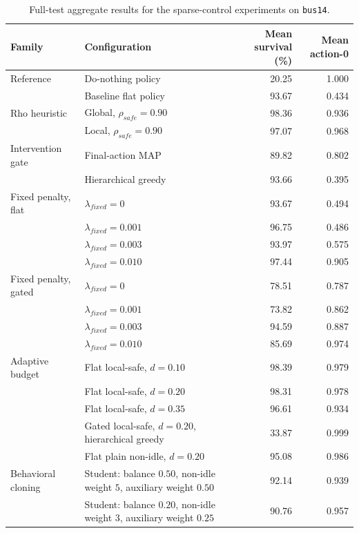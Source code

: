 \begin{table}[H]
  \centering
  \scriptsize
  \caption{Full-test aggregate results for the sparse-control experiments on
  \texttt{bus14}.}
  \label{tab:sparse-control-full-results}
  \setlength{\tabcolsep}{4pt}
  \renewcommand{\arraystretch}{0.94}
  \begin{tabular}{L{0.14\textwidth}L{0.48\textwidth}rr}
    \toprule
    Family & Configuration & Mean survival (\%) & Mean action-0 \\
    \midrule
    Reference
      & Do-nothing policy & 20.25 & 1.000 \\
      & Baseline flat policy & 93.67 & 0.434 \\
    \midrule
    Rho heuristic
      & Global, $\rho_{safe}=0.90$ & 98.36 & 0.936 \\
      & Local, $\rho_{safe}=0.90$ & 97.07 & 0.968 \\
    \midrule
    Intervention gate
      & Final-action MAP & 89.82 & 0.802 \\
      & Hierarchical greedy & 93.66 & 0.395 \\
    \midrule
    Fixed penalty, flat
      & $\lambda_{fixed}=0$ & 93.67 & 0.494 \\
      & $\lambda_{fixed}=0.001$ & 96.75 & 0.486 \\
      & $\lambda_{fixed}=0.003$ & 93.97 & 0.575 \\
      & $\lambda_{fixed}=0.010$ & 97.44 & 0.905 \\
    \midrule
    Fixed penalty, gated
      & $\lambda_{fixed}=0$ & 78.51 & 0.787 \\
      & $\lambda_{fixed}=0.001$ & 73.82 & 0.862 \\
      & $\lambda_{fixed}=0.003$ & 94.59 & 0.887 \\
      & $\lambda_{fixed}=0.010$ & 85.69 & 0.974 \\
    \midrule
    Adaptive budget
      & Flat local-safe, $d=0.10$ & 98.39 & 0.979 \\
      & Flat local-safe, $d=0.20$ & 98.31 & 0.978 \\
      & Flat local-safe, $d=0.35$ & 96.61 & 0.934 \\
      & Gated local-safe, $d=0.20$, hierarchical greedy & 33.87 & 0.999 \\
      & Flat plain non-idle, $d=0.20$ & 95.08 & 0.986 \\
    \midrule
    Behavioral cloning
      & Student: balance $0.50$, non-idle weight $5$, auxiliary weight $0.50$ & 92.14 & 0.939 \\
      & Student: balance $0.20$, non-idle weight $3$, auxiliary weight $0.25$ & 90.76 & 0.957 \\
    \bottomrule
  \end{tabular}
\end{table}

